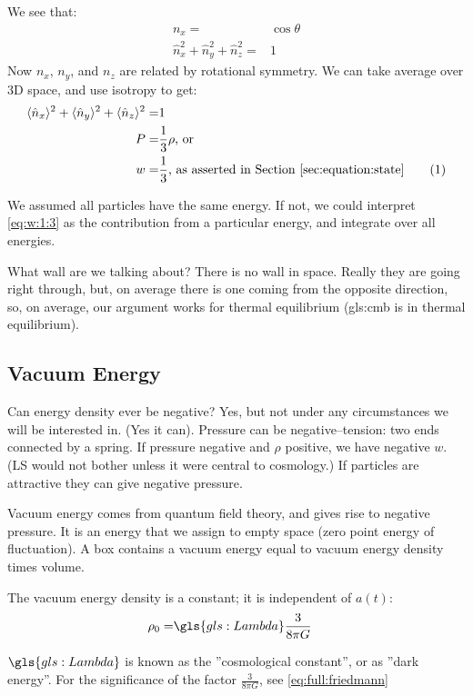 \documentclass[]{article}
\newcommand\numberthis{\addtocounter{equation}{1}\tag{\theequation}}
\begin{document}
We see that:
\begin{align*}
	n_x =& \cos{\theta}\\
	\hat{n}_x^2 +  \hat{n}_y^2 +  \hat{n}_z^2=&1
\end{align*}
Now $n_x$, $n_y$, and $n_z$ are related by rotational symmetry. We can take average over 3D space, and use isotropy to get:
\begin{align*}
		\langle \hat{n}_x\rangle^2 + \langle \hat{n}_y\rangle^2 + \langle \hat{n}_z\rangle^2=&1\\
	P =&\frac{1}{3} \rho \text{, or}\\
	w =& \frac{1}{3}\text{, as asserted in Section \ref{sec:equation:state}}\numberthis \label{eq:w:1:3}
\end{align*}

We assumed all particles have the same energy. If not, we could interpret \eqref{eq:w:1:3} as the contribution from a particular energy, and integrate over all energies.

What wall are we talking about? There is no wall in space. Really they are going right through, but, on average there is one coming from the opposite direction, so, on average, our argument works for thermal equilibrium (\gls{gls:cmb} is in thermal equilibrium).

\subsection{Vacuum Energy}
Can energy density ever be negative? Yes, but not under any circumstances we will be interested in. (Yes it can). Pressure can be negative--tension: two ends connected by a spring. If pressure negative and $\rho$ positive, we have negative $w$. (LS would not bother unless it were central to cosmology.) If particles are attractive they can give negative pressure.

Vacuum energy comes from quantum field theory, and gives rise to negative pressure. It is an energy that we assign to empty space (zero point energy of fluctuation). A box contains a vacuum energy equal to vacuum energy density times volume.

The vacuum energy density is a constant; it is independent of $a(t)$:
\begin{align*}
	\rho_0 =& \gls{gls:Lambda} \frac{3}{8 \pi G}
\end{align*}

$\gls{gls:Lambda}$ is known as the ''cosmological constant'', or as ''dark energy''. For the significance of the factor $\frac{3}{8 \pi G}$, see \eqref{eq:full:friedmann}
\end{document}

